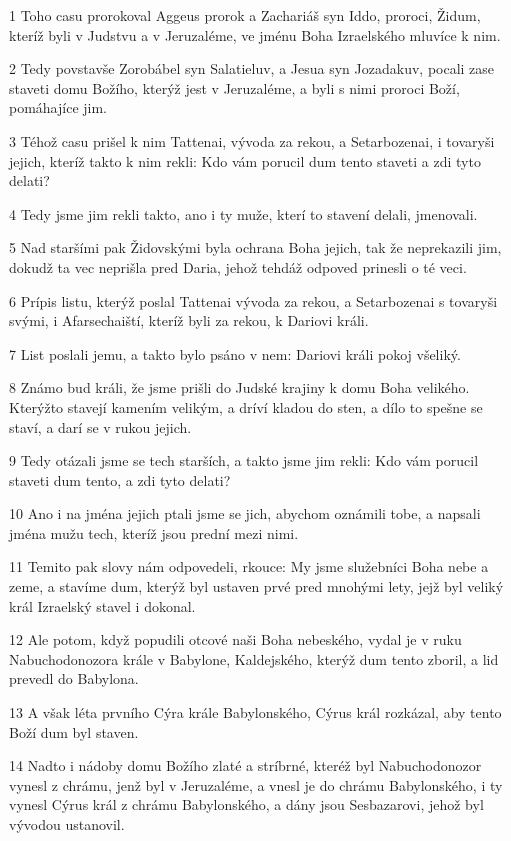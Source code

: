 \par 1 Toho casu prorokoval Aggeus prorok a Zachariáš syn Iddo, proroci, Židum, kteríž byli v Judstvu a v Jeruzaléme, ve jménu Boha Izraelského mluvíce k nim.
\par 2 Tedy povstavše Zorobábel syn Salatieluv, a Jesua syn Jozadakuv, pocali zase staveti domu Božího, kterýž jest v Jeruzaléme, a byli s nimi proroci Boží, pomáhajíce jim.
\par 3 Téhož casu prišel k nim Tattenai, vývoda za rekou, a Setarbozenai, i tovaryši jejich, kteríž takto k nim rekli: Kdo vám porucil dum tento staveti a zdi tyto delati?
\par 4 Tedy jsme jim rekli takto, ano i ty muže, kterí to stavení delali, jmenovali.
\par 5 Nad staršími pak Židovskými byla ochrana Boha jejich, tak že neprekazili jim, dokudž ta vec neprišla pred Daria, jehož tehdáž odpoved prinesli o té veci.
\par 6 Prípis listu, kterýž poslal Tattenai vývoda za rekou, a Setarbozenai s tovaryši svými, i Afarsechaiští, kteríž byli za rekou, k Dariovi králi.
\par 7 List poslali jemu, a takto bylo psáno v nem: Dariovi králi pokoj všeliký.
\par 8 Známo bud králi, že jsme prišli do Judské krajiny k domu Boha velikého. Kterýžto stavejí kamením velikým, a dríví kladou do sten, a dílo to spešne se staví, a darí se v rukou jejich.
\par 9 Tedy otázali jsme se tech starších, a takto jsme jim rekli: Kdo vám porucil staveti dum tento, a zdi tyto delati?
\par 10 Ano i na jména jejich ptali jsme se jich, abychom oznámili tobe, a napsali jména mužu tech, kteríž jsou prední mezi nimi.
\par 11 Temito pak slovy nám odpovedeli, rkouce: My jsme služebníci Boha nebe a zeme, a stavíme dum, kterýž byl ustaven prvé pred mnohými lety, jejž byl veliký král Izraelský stavel i dokonal.
\par 12 Ale potom, když popudili otcové naši Boha nebeského, vydal je v ruku Nabuchodonozora krále v Babylone, Kaldejského, kterýž dum tento zboril, a lid prevedl do Babylona.
\par 13 A však léta prvního Cýra krále Babylonského, Cýrus král rozkázal, aby tento Boží dum byl staven.
\par 14 Nadto i nádoby domu Božího zlaté a stríbrné, kteréž byl Nabuchodonozor vynesl z chrámu, jenž byl v Jeruzaléme, a vnesl je do chrámu Babylonského, i ty vynesl Cýrus král z chrámu Babylonského, a dány jsou Sesbazarovi, jehož byl vývodou ustanovil.
